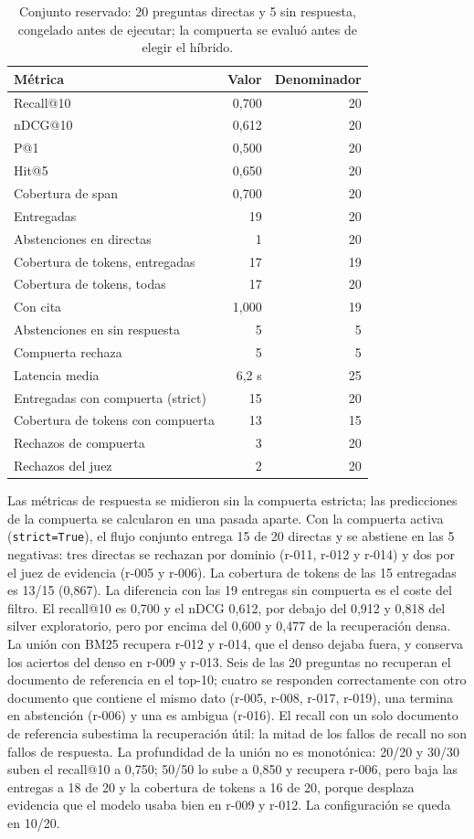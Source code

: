 \begin{table}[t]
\centering
\footnotesize
\caption{Conjunto reservado: 20 preguntas directas y 5 sin respuesta, congelado antes de ejecutar; la compuerta se evalu\'o antes de elegir el h\'ibrido.}
\label{tab:reservado}
\begin{tabular}{lrr}
\toprule
M\'etrica & Valor & Denominador \\
\midrule
Recall@10 & 0,700 & 20 \\
nDCG@10 & 0,612 & 20 \\
P@1 & 0,500 & 20 \\
Hit@5 & 0,650 & 20 \\
Cobertura de span & 0,700 & 20 \\
Entregadas & 19 & 20 \\
Abstenciones en directas & 1 & 20 \\
Cobertura de tokens, entregadas & 17 & 19 \\
Cobertura de tokens, todas & 17 & 20 \\
Con cita & 1,000 & 19 \\
Abstenciones en sin respuesta & 5 & 5 \\
Compuerta rechaza & 5 & 5 \\
Latencia media & 6,2 s & 25 \\
Entregadas con compuerta (strict) & 15 & 20 \\
Cobertura de tokens con compuerta & 13 & 15 \\
Rechazos de compuerta & 3 & 20 \\
Rechazos del juez & 2 & 20 \\
\bottomrule
\end{tabular}
\end{table}


Las m\'etricas de respuesta se midieron sin la compuerta estricta; las predicciones de la compuerta se calcularon en una pasada aparte. Con la compuerta activa (\texttt{strict=True}), el flujo conjunto entrega 15 de 20 directas y se abstiene en las 5 negativas: tres directas se rechazan por dominio (r-011, r-012 y r-014) y dos por el juez de evidencia (r-005 y r-006). La cobertura de tokens de las 15 entregadas es 13/15 (0,867). La diferencia con las 19 entregas sin compuerta es el coste del filtro. El recall@10 es 0,700 y el nDCG 0,612, por debajo del 0,912 y 0,818 del silver exploratorio, pero por encima del 0,600 y 0,477 de la recuperaci\'on densa. La uni\'on con BM25 recupera r-012 y r-014, que el denso dejaba fuera, y conserva los aciertos del denso en r-009 y r-013. Seis de las 20 preguntas no recuperan el documento de referencia en el top-10; cuatro se responden correctamente con otro documento que contiene el mismo dato (r-005, r-008, r-017, r-019), una termina en abstenci\'on (r-006) y una es ambigua (r-016). El recall con un solo documento de referencia subestima la recuperaci\'on \'util: la mitad de los fallos de recall no son fallos de respuesta. La profundidad de la uni\'on no es monot\'onica: 20/20 y 30/30 suben el recall@10 a 0,750; 50/50 lo sube a 0,850 y recupera r-006, pero baja las entregas a 18 de 20 y la cobertura de tokens a 16 de 20, porque desplaza evidencia que el modelo usaba bien en r-009 y r-012. La configuraci\'on se queda en 10/20.

